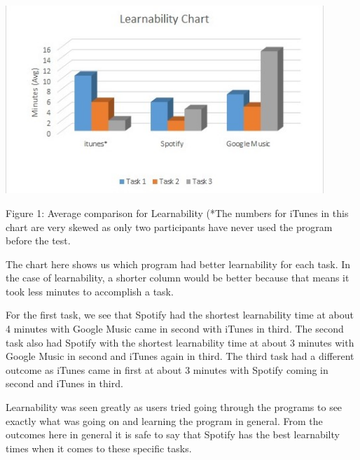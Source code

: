 \documentclass{article}
\begin{document}
\begin{center}
\includegraphics[width=120mm]{Learnability.jpg}
\end{center}
\begin{center}
Figure 1: Average comparison for Learnability (*The numbers for iTunes in this chart are very skewed as only two participants have never used the program before the test. %
\end{center}

The chart here shows us which program had better learnability for each task. In the case of learnability, a shorter column would be better because that means it took less minutes to accomplish a task. 

For the first task, we see that Spotify had the shortest learnability time at about 4 minutes with Google Music came in second with iTunes in third. The second task also had Spotify with the shortest learnability time at about 3 minutes with Google Music in second and iTunes again in third. The third task had a different outcome as iTunes came in first at about 3 minutes with Spotify coming in second and iTunes in third. %

Learnability was seen greatly as users tried going through the programs to see exactly what was going on and learning the program in general. From the outcomes here in general it is safe to say that Spotify has the best learnabilty times when it comes to these specific tasks.
\end{document}
